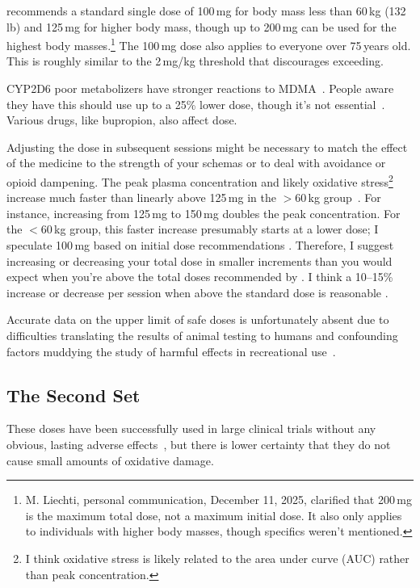 \documentclass[11pt,oneside]{book}
\let\cite\parencite
\begin{document}
\textcite{liechtiInteractions} recommends a standard single dose of 100\,mg for body mass less than 60\,kg (132\,lb) and 125\,mg for higher body mass, though up to 200\,mg can be used for the highest body masses.\footnote{M. Liechti, personal communication, December 11, 2025, clarified that 200\,mg is the maximum total dose, not a maximum initial dose. It also only applies to individuals with higher body masses, though specifics weren't mentioned.} The 100\,mg dose also applies to everyone over 75\,years old. This is roughly similar to the 2\,mg/kg threshold that \textcite{baggottSupplements} discourages exceeding.

CYP2D6 poor metabolizers have stronger reactions to MDMA~\cite{schmid2016cyp2d6}. People aware they have this should use up to a 25\% lower dose, though it's not essential~\cite{liechtiInteractions}. Various drugs, like bupropion, also affect dose.

Adjusting the dose in subsequent sessions might be necessary to match the effect of the medicine to the strength of your schemas or to deal with avoidance or opioid dampening. The peak plasma concentration and likely oxidative stress\footnote{I think oxidative stress is likely related to the area under curve (AUC) rather than peak concentration.} increase much faster than linearly above 125\,mg in the $>$60\,kg group~\cite{de2000nonlinear}. For instance, increasing from 125\,mg to 150\,mg doubles the peak concentration. For the $<$60\,kg group, this faster increase presumably starts at a lower dose; I speculate 100\,mg based on initial dose recommendations . Therefore, I suggest increasing or decreasing your total dose in smaller increments than you would expect when you're above the total doses recommended by \textcite{liechtiInteractions}. I think a 10--15\% increase or decrease per session when above the standard dose is reasonable .

Accurate data on the upper limit of safe doses is unfortunately absent due to difficulties translating the results of animal testing to humans and confounding factors muddying the study of harmful effects in recreational use~\cite{passieHistory}.

\subsection*{The Second Set}
These doses have been successfully used in large clinical trials without any obvious, lasting adverse effects~\cite{mithoeferSafety}, but there is lower certainty that they do not cause small amounts of oxidative damage.
\end{document}
